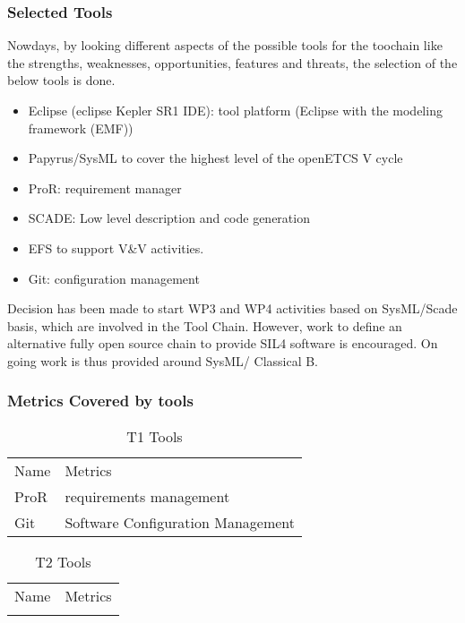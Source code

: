 \documentclass{template/openetcs_article}
\begin{document}

\subsubsection{Selected Tools}
Nowdays, by looking different aspects of the possible tools for the toochain like the strengths, weaknesses, opportunities, features and threats, the selection of the below tools is done.

\begin{itemize}
\item Eclipse (eclipse Kepler SR1 IDE): tool platform (Eclipse with the modeling framework (EMF))
\item Papyrus/SysML to cover the highest level of the openETCS V cycle
\item ProR: requirement manager
\item SCADE: Low level description and code generation
\item EFS to support V\&V activities.
\item Git: configuration management
\end{itemize}

Decision has been made to start WP3 and WP4 activities based on SysML/Scade basis, which are involved in the Tool Chain. However, work to define an alternative fully open source chain to provide SIL4 software is encouraged. On going work is thus provided around SysML/ Classical B.

\subsubsection{Metrics Covered by tools}

\begin{table}[H]
\begin{tabular}{|m{3cm}|m{10cm}|}
\hline
\rowcolor{myblue}
\multicolumn{2}{|c|}{T1 Tools} \\\hline
\rowcolor{lightgray}
Name &
Metrics 
\\\hline
ProR & requirements management\\\hline
Git & Software Configuration Management\\\hline
\end{tabular}
\caption{T1 Tools}
\end{table}

\begin{table}[H]
\begin{tabular}{|m{3cm}|m{10cm}|}
\hline
\rowcolor{myblue}
\multicolumn{2}{|c|}{T2 Tools} \\\hline
\rowcolor{lightgray}
Name &
Metrics 
\\\hline
 & \\\hline
\end{tabular}
\caption{T2 Tools}
\end{table}
\end{document}
